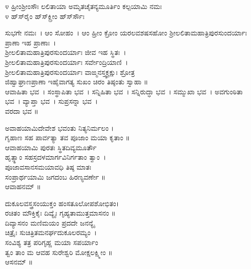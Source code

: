 ೪ ಹ್ರೀಂಶ್ರೀಂಸೌಃ ಲಲಿತಾಯಾ ಅಮೃತಚೈತನ್ಯಮೂರ್ತಿಂ ಕಲ್ಪಯಾಮಿ ನಮಃ\\
೪ ಹ್‌ಸ್‌ರೈಂ ಹ್‌ಸ್‌ಕ್ಲ್ರೀಂ ಹ್‌ಸ್‌ರ್ಸೌಃ\\

ಸುಭಗೇ ನಮಃ~। ಆಂ ಸೋಹಂ~। ಆಂ ಹ್ರೀಂ ಕ್ರೋಂ ಯರಲವಶಷಸಹೋಂ ಶ್ರೀಲಲಿತಾಮಹಾತ್ರಿಪುರಸುಂದರ್ಯಾಃ ಪ್ರಾಣಾ ಇಹ ಪ್ರಾಣಾಃ~।\\ ಶ್ರೀಲಲಿತಾಮಹಾತ್ರಿಪುರಸುಂದರ್ಯಾಃ ಜೀವ ಇಹ ಸ್ಥಿತಃ~।\\ ಶ್ರೀಲಲಿತಾಮಹಾತ್ರಿಪುರಸುಂದರ್ಯಾಃ ಸರ್ವೇಂದ್ರಿಯಾಣಿ~।\\ಶ್ರೀಲಲಿತಾಮಹಾತ್ರಿಪುರಸುಂದರ್ಯಾಃ ವಾಙ್ಮನಸ್ತ್ವಕ್ಚಕ್ಷುಃ ಶ್ರೋತ್ರ\\ಜಿಹ್ವಾಘ್ರಾಣಪ್ರಾಣಾ ಇಹೈವಾಗತ್ಯ ಸುಖಂ ಚಿರಂ ತಿಷ್ಠಂತು ಸ್ವಾಹಾ ॥\\ಆವಾಹಿತಾ ಭವ~। ಸಂಸ್ಥಾಪಿತಾ ಭವ~। ಸನ್ನಿಹಿತಾ ಭವ~। ಸನ್ನಿರುದ್ಧಾ ಭವ~। ಸಮ್ಮುಖಾ ಭವ~। ಅವಗುಂಠಿತಾ ಭವ~। ವ್ಯಾಪ್ತಾ ಭವ~। ಸುಪ್ರಸನ್ನಾ ಭವ~।\\ ವರದಾ ಭವ ॥


ಅವಾಹಯಾಮಿದೇವೇಶ ಭವಂತು ನಿತ್ಯನಿರ್ಮಲಂ ।\\
ಗೃಹಾಣ ಸಹ ಪಾರ್ವತ್ಯಾ ತವ ಪೂಜಾಂ ಮಯಾ ಕೃತಾಂ ॥\\
ಆವಾಹಯಾಮಿ ಪುರತಃ ಸ್ಥಿತದಿವ್ಯಮೂರ್ತೌ \\ಹೃತ್ಸ್ಥಾಂ ಸಹಸ್ರದಳಮಾರ್ಗವಿನಿರ್ಗತಾಂ ತ್ವಾಂ~।\\
ಪೂಜಾವಸಾನಸಮಯಾವಧಿ ತಿಷ್ಠ ಮಾತಃ \\ಸಂಪ್ರಾರ್ಥಯಾಮಿ ಜಗದಂಬ ಹಿರಣ್ಯವರ್ಣೇ ॥\\
 ಆವಾಹನಮ್ ॥

ದುಕೂಲವಸ್ತ್ರಸಂಯುಕ್ತಂ ಹಂಸತೂಲೋಪಶೋಭಿತಂ।\\
ರಚಿತಂ ಮೌಕ್ತಿಕೈಃ ದಿವ್ಯೈಃ ಗೃಹ್ಯತಾಮುತ್ತಮಾಸನಂ ॥\\
ದಿವ್ಯಾಸನಂ ಮಣಿಮಯಂ ಪ್ರದದೇ ಜನನ್ಯೈ\\ ಚಿತ್ರೈಃ ಸುಚಿತ್ರಿತಮನರ್ಘದುಕೂಲರಮ್ಯಂ~।\\
ಸಂವಿಶ್ಯ ತತ್ರ ಪರಿಗೃಹ್ಣ ಮಯಾ ಸಪರ್ಯಾಂ\\ ತ್ವಂ ತಾಂ ಮ ಆವಹ ಸುರೇಶ್ವರಿ ಮೋಕ್ಷಲಕ್ಷ್ಮೀಂ ॥\\
ಆಸನಮ್ ॥

